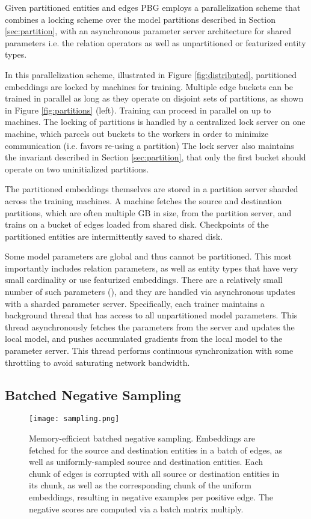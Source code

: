 \documentclass{article}
\begin{document}
Given partitioned entities and edges PBG employs a parallelization scheme that combines a locking scheme over the model partitions described in Section \ref{sec:partition}, with an asynchronous parameter server architecture for shared parameters i.e. the relation operators as well as unpartitioned or featurized entity types.

In this parallelization scheme, illustrated in Figure \ref{fig:distributed}, partitioned embeddings are locked by machines for training. Multiple edge buckets can be trained in parallel as long as they operate on disjoint sets of partitions, as shown in Figure \ref{fig:partitions} (left). Training can proceed in parallel on up to  machines. The locking of partitions is handled by a centralized lock server on one machine, which parcels out buckets to the workers in order to minimize communication (i.e. favors re-using a partition) The lock server also maintains the invariant described in Section \ref{sec:partition}, that only the first bucket should operate on two uninitialized partitions.

The partitioned embeddings themselves are stored in a partition server sharded across the  training machines. A machine fetches the source and destination partitions, which are often multiple GB in size, from the partition server, and trains on a bucket of edges loaded from shared disk. Checkpoints of the partitioned entities are intermittently saved to shared disk.

Some model parameters are global and thus cannot be partitioned. This most importantly includes relation parameters, as well as entity types that have very small cardinality or use featurized embeddings. There are a relatively small number of such parameters (), and they are handled via asynchronous updates with a sharded parameter server. Specifically, each trainer maintains a background thread that has access to all unpartitioned model parameters. This thread asynchronously fetches the parameters from the server and updates the local model, and pushes accumulated gradients from the local model to the parameter server. This thread performs continuous synchronization with some throttling to avoid saturating network bandwidth.

\subsection{Batched Negative Sampling}

\begin{figure*}[t]
\centering
\texttt{[image: sampling.png]}
\vspace{-5mm}

\caption{Memory-efficient batched negative sampling. Embeddings are fetched for the  source and destination entities in a batch of edges, as well as  uniformly-sampled source and destination entities. Each chunk of  edges is corrupted with all source or destination entities in its chunk, as well as the corresponding chunk of the uniform embeddings, resulting in  negative examples per positive edge. The negative scores are computed via a batch matrix multiply.}
\label{fig:sampling}
\end{figure*}
\end{document}
